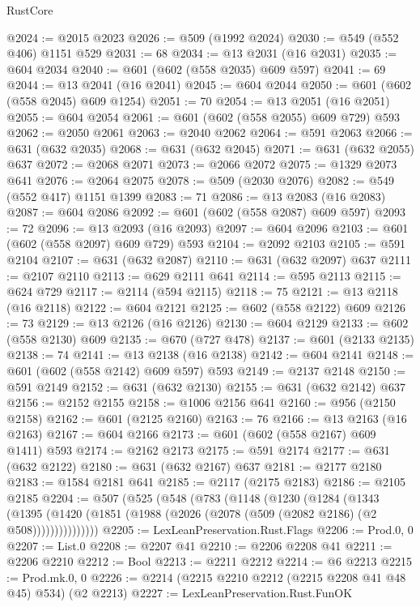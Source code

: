 \begin{lexlean}{RustCore}
\begin{coremodule}
@2024 := @2015 @2023
@2026 := @509 (@1992 @2024)
@2030 := @549 (@552 @406) @1151 @529
@2031 := 68
@2034 := @13 @2031 (@16 @2031)
@2035 := @604 @2034
@2040 := @601 (@602 (@558 @2035) @609 @597)
@2041 := 69
@2044 := @13 @2041 (@16 @2041)
@2045 := @604 @2044
@2050 := @601 (@602 (@558 @2045) @609 @1254)
@2051 := 70
@2054 := @13 @2051 (@16 @2051)
@2055 := @604 @2054
@2061 := @601 (@602 (@558 @2055) @609 @729) @593
@2062 := @2050 @2061
@2063 := @2040 @2062
@2064 := @591 @2063
@2066 := @631 (@632 @2035)
@2068 := @631 (@632 @2045)
@2071 := @631 (@632 @2055) @637
@2072 := @2068 @2071
@2073 := @2066 @2072
@2075 := @1329 @2073 @641
@2076 := @2064 @2075
@2078 := @509 (@2030 @2076)
@2082 := @549 (@552 @417) @1151 @1399
@2083 := 71
@2086 := @13 @2083 (@16 @2083)
@2087 := @604 @2086
@2092 := @601 (@602 (@558 @2087) @609 @597)
@2093 := 72
@2096 := @13 @2093 (@16 @2093)
@2097 := @604 @2096
@2103 := @601 (@602 (@558 @2097) @609 @729) @593
@2104 := @2092 @2103
@2105 := @591 @2104
@2107 := @631 (@632 @2087)
@2110 := @631 (@632 @2097) @637
@2111 := @2107 @2110
@2113 := @629 @2111 @641
@2114 := @595 @2113
@2115 := @624 @729
@2117 := @2114 (@594 @2115)
@2118 := 75
@2121 := @13 @2118 (@16 @2118)
@2122 := @604 @2121
@2125 := @602 (@558 @2122) @609
@2126 := 73
@2129 := @13 @2126 (@16 @2126)
@2130 := @604 @2129
@2133 := @602 (@558 @2130) @609
@2135 := @670 (@727 @478)
@2137 := @601 (@2133 @2135)
@2138 := 74
@2141 := @13 @2138 (@16 @2138)
@2142 := @604 @2141
@2148 := @601 (@602 (@558 @2142) @609 @597) @593
@2149 := @2137 @2148
@2150 := @591 @2149
@2152 := @631 (@632 @2130)
@2155 := @631 (@632 @2142) @637
@2156 := @2152 @2155
@2158 := @1006 @2156 @641
@2160 := @956 (@2150 @2158)
@2162 := @601 (@2125 @2160)
@2163 := 76
@2166 := @13 @2163 (@16 @2163)
@2167 := @604 @2166
@2173 := @601 (@602 (@558 @2167) @609 @1411) @593
@2174 := @2162 @2173
@2175 := @591 @2174
@2177 := @631 (@632 @2122)
@2180 := @631 (@632 @2167) @637
@2181 := @2177 @2180
@2183 := @1584 @2181 @641
@2185 := @2117 (@2175 @2183)
@2186 := @2105 @2185
@2204 := @507
    (@525
      (@548
        (@783
          (@1148
            (@1230
              (@1284
                (@1343
                  (@1395
                    (@1420 (@1851 (@1988 (@2026 (@2078 (@509 (@2082 @2186) (@2 @508)))))))))))))))
@2205 := LexLeanPreservation.Rust.Flags
@2206 := Prod.{0, 0}
@2207 := List.{0}
@2208 := @2207 @41
@2210 := @2206 @2208 @41
@2211 := @2206 @2210
@2212 := Bool
@2213 := @2211 @2212
@2214 := @6 @2213
@2215 := Prod.mk.{0, 0}
@2226 := @2214 (@2215 @2210 @2212 (@2215 @2208 @41 @48 @45) @534) (@2 @2213)
@2227 := LexLeanPreservation.Rust.FunOK

\end{coremodule}
\end{lexlean}
